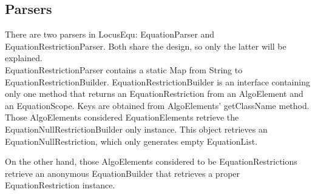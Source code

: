 \documentclass[12pt, oneside, a4paper]{article}
\begin{document}
\subsection{Parsers}
\label{ss:Parsers}

There are two parsers in LocusEqu: EquationParser and
EquationRestrictionParser. Both share the design, so only the latter
will be explained.\\

EquationRestrictionParser contains a static Map from String to
EquationRestrictionBuilder. EquationRestrictionBuilder is an interface
containing only one method that returns an EquationRestriction from an
AlgoElement and an EquationScope. Keys are obtained from AlgoElements'
getClassName method.\\

Those AlgoElements considered EquationElements retrieve the
EquationNullRestrictionBuilder only instance. This object retrieves an
EquationNullRestriction, which only generates empty EquationList.

On the other hand, those AlgoElements considered to be
EquationRestrictions retrieve an anonymous EquationBuilder that
retrieves a proper EquationRestriction instance.
\end{document}
